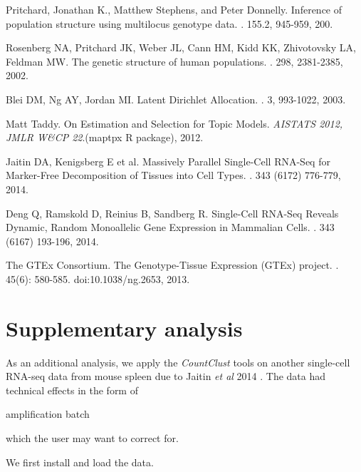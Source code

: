 \documentclass[12pt]{article}\usepackage[]{graphicx}\usepackage[usenames,dvipsnames]{color}
\newcommand{\CountClust}{\textit{CountClust}}
\begin{document}
\begin{thebibliography}{1}

Pritchard, Jonathan K., Matthew Stephens, and Peter Donnelly.
\newblock Inference of population structure using multilocus genotype data.
. 155.2,  945-959, 200.

Rosenberg NA, Pritchard JK,  Weber JL, Cann HM,  Kidd KK,  Zhivotovsky LA,  Feldman MW.
\newblock The genetic structure of human populations.
. 298,  2381-2385, 2002.

Blei DM,  Ng AY, Jordan MI.
\newblock Latent Dirichlet Allocation.
. 3, 993-1022, 2003.

Matt Taddy.
\newblock On Estimation and Selection for Topic Models.
\newblock \textit{AISTATS 2012, JMLR W\&CP 22}.(maptpx R package), 2012.

Jaitin DA,  Kenigsberg E et al.
\newblock Massively Parallel Single-Cell RNA-Seq for Marker-Free Decomposition of Tissues into Cell Types.
. 343 (6172) 776-779, 2014.

Deng Q,  Ramskold D,  Reinius B,  Sandberg R.
\newblock Single-Cell RNA-Seq Reveals Dynamic, Random Monoallelic Gene Expression in Mammalian Cells.
.  343 (6167) 193-196, 2014.

The GTEx Consortium.
\newblock The Genotype-Tissue Expression (GTEx) project.
. 45(6): 580-585. doi:10.1038/ng.2653, 2013.

\end{thebibliography}

% 

\section{Supplementary analysis}

As an additional analysis, we apply the \CountClust{} tools on another single-cell RNA-seq data from mouse spleen due to Jaitin \textit{et al} 2014 \cite{Jaitin2014}. The data had technical effects in the form of \begin{verb} amplification batch \end{verb} which the user may want to correct for.

We first install and load the data.
\end{document}
